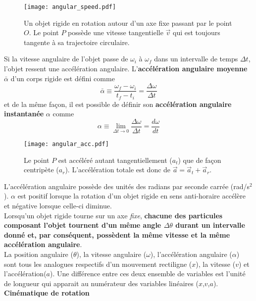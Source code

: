 \documentclass[titlepage,oneside,a4paper,11pt]{book} %
\begin{document}
\begin{figure}[H]
\centering
\texttt{[image: angular\_speed.pdf]}
\caption{Un objet rigide en rotation autour d'un axe fixe passant par le point $O$. Le point $P$ possède une vitesse tangentielle $\vec{v}$ qui est toujours tangente à sa trajectoire circulaire.}
\end{figure}

Si la vitesse angulaire de l'objet passe de $\omega_i$ à $\omega_f$ dans un intervalle de temps $\Delta t$, l'objet ressent une accélération angulaire. L'\textbf{accélération angulaire moyenne} $\bar{\alpha}$ d'un corps rigide est défini comme
\begin{equation}
\bar{\alpha} \equiv \frac{\omega_{f}-\omega_{i}}{t_{f}-t_{i}}=\frac{\Delta \omega}{\Delta t}
\end{equation}
et de la même façon, il est possible de définir son \textbf{accélération angulaire instantanée} $\alpha$ comme
\begin{equation}
\alpha \equiv \lim _{\Delta t \rightarrow 0} \frac{\Delta \omega}{\Delta t}=\frac{d \omega}{d t}
\label{eq:acc}
\end{equation}

\begin{figure}[H]
\centering
\texttt{[image: angular\_acc.pdf]}
\caption{Le point $P$ est accéléré autant tangentiellement ($a_t$) que de façon centripète ($a_r$). L'accélération totale est donc de $\vec{a}=\vec{a}_t+\vec{a}_r$.}
\end{figure}
L'accélération angulaire possède des unités des radians par seconde carrée (rad/s$^2$). $\alpha$ est positif lorsque la rotation d'un objet rigide en sens anti-horaire accélère et négative lorsque celle-ci diminue.\\

Lorsqu'un objet rigide tourne sur un axe \emph{fixe}, \textbf{chacune des particules composant l'objet tournent d'un même angle $\Delta \theta$ durant un intervalle donné et, par conséquent, possèdent la même vitesse et la même accélération angulaire}.\\

La position angulaire ($\theta$), la vitesse angulaire ($\omega$), l'accélération angulaire ($\alpha$) sont tous les analogues respectifs d'un mouvement rectiligne ($x$), la vitesse ($v$) et l'accélération($a$). Une différence entre ces deux ensemble de variables est l'unité de longueur qui apparait au numérateur des variables linéaires ($x$,$v$,$a$).\\
\newpage
{\large \textbf{Cinématique de rotation}}\\
\end{document}
